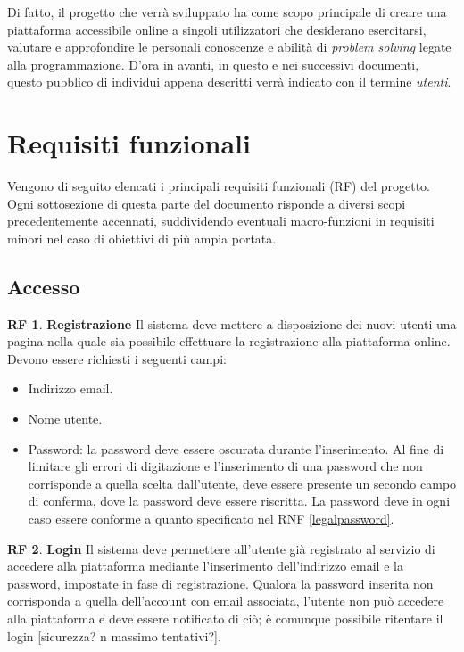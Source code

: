 \documentclass[11pt, a4paper]{article}
\theoremstyle{definition}
\newtheorem{funcreq}{RF} %
\begin{document}
Di fatto, il progetto che verrà sviluppato ha come scopo principale di
creare una piattaforma accessibile online a singoli utilizzatori che
desiderano esercitarsi, valutare e approfondire le personali
conoscenze e abilità di \textit{problem solving} legate alla programmazione.
D'ora in avanti, in questo e nei successivi documenti, questo pubblico di
individui appena descritti verrà indicato con il termine \textit{utenti}.

\newpage
\section{Requisiti funzionali}
Vengono di seguito elencati i principali requisiti funzionali (RF)
del progetto. Ogni sottosezione di questa parte del documento
risponde a diversi scopi precedentemente accennati, suddividendo
eventuali macro-funzioni in requisiti minori nel caso di obiettivi
di più ampia portata.

\subsection{Accesso}

\begin{funcreq}
\label{signup}
\textbf{Registrazione }
Il sistema deve mettere a disposizione dei nuovi utenti una pagina
nella quale sia possibile effettuare la registrazione alla piattaforma
online. Devono essere richiesti i seguenti campi:
\begin{itemize}
    \item Indirizzo email.
    \item Nome utente.
    \item Password: la password deve essere oscurata durante l'inserimento.
    Al fine di limitare gli errori di digitazione e l'inserimento di una
    password che non corrisponde a quella scelta dall'utente, deve essere
    presente un secondo campo di conferma, dove la password deve essere
    riscritta. La password deve in ogni caso essere conforme a quanto
    specificato nel RNF \ref{legalpassword}.
\end{itemize}
\end{funcreq}

\begin{funcreq}
\label{login}
\textbf{Login }
Il sistema deve permettere all'utente già registrato al servizio di
accedere alla piattaforma mediante l'inserimento dell'indirizzo
email e la password, impostate in fase di registrazione. Qualora la
password inserita non corrisponda a quella dell'account con email
associata, l'utente non può accedere alla piattaforma e deve essere
notificato di ciò; è comunque possibile ritentare il login [sicurezza?
n massimo tentativi?].
\end{funcreq}
\end{document}
